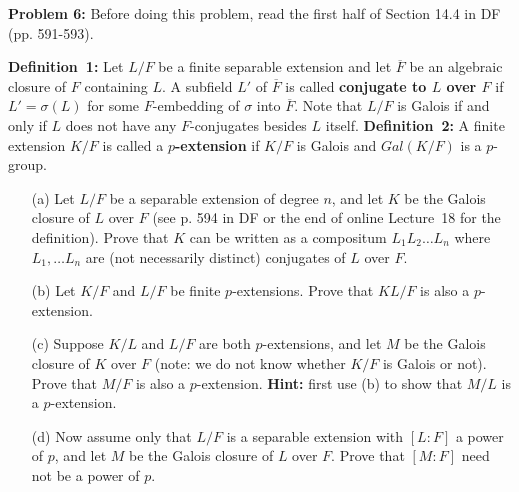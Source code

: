 \documentclass[12pt]{amsart}
\begin{document}
{\bf Problem 6:} \rm Before doing this problem, read the first half
of Section 14.4 in DF (pp. 591-593).

{\bf Definition~1:} Let $L/F$ be a finite separable extension
and let $\overline F$ be an algebraic closure of $F$ containing $L$.
A subfield $L'$ of $\overline F$ is called
{\bf conjugate to $L$ over $F$} if $L'=\sigma(L)$ for some $F$-embedding of
$\sigma$ into $\overline F$. Note that $L/F$ is Galois if and
only if $L$ does not have any $F$-conjugates besides $L$ itself.
\skv
{\bf Definition~2:} A finite extension $K/F$ is called
a {\bf $p$-extension} if $K/F$ is Galois and $Gal(K/F)$ is a $p$-group.
\skv
\begin{itemize}
\item[(a)] Let $L/F$ be a separable extension of degree $n$, and
let $K$ be the Galois closure of $L$ over $F$ (see p. 594 in DF or the end of online Lecture~18 for the definition). 
Prove that $K$ can be written as a compositum $L_1L_2\ldots L_n$
where $L_1,\ldots L_n$ are (not necessarily distinct) conjugates of
$L$ over $F$.

\item[(b)] Let $K/F$ and $L/F$ be finite $p$-extensions. Prove
that $KL/F$ is also a $p$-extension.

\item[(c)] Suppose $K/L$ and $L/F$ are both $p$-extensions, and
let $M$ be the Galois closure of $K$ over $F$ (note: we do
not know whether $K/F$ is Galois or not). Prove that
$M/F$ is also a $p$-extension. {\bf Hint:} first use (b) to show that
$M/L$ is a $p$-extension.

\item[(d)] Now assume only that $L/F$ is a separable extension
with $[L:F]$ a power of $p$, and let $M$ be the Galois closure
of $L$ over $F$. Prove that $[M:F]$ need not be a power of $p$.
\end{itemize}
\end{document}
